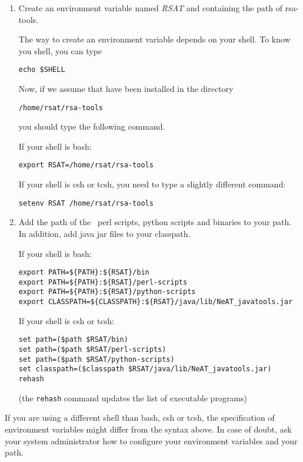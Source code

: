 \documentclass{book}
\begin{document}
\begin{enumerate}

\item Create an environment variable named \textit{RSAT} and
  containing the path of rsa-tools.

  The way to create an environment variable depends on your shell. To
  know you shell, you can type

\begin{verbatim}
echo $SHELL
\end{verbatim}

Now, if we assume that \RSAT have been installed in the directory

\begin{verbatim}
/home/rsat/rsa-tools
\end{verbatim}

you should type the following command.

If your shell is bash:
\begin{verbatim}
export RSAT=/home/rsat/rsa-tools
\end{verbatim}

If your shell is csh or tcsh, you need to type a slightly different
command:

\begin{verbatim}
setenv RSAT /home/rsat/rsa-tools
\end{verbatim}

\item Add the path of the \RSAT \ perl scripts, python scripts and binaries to your path. In addition, add java jar files
to your classpath.

If your shell is bash:
\begin{verbatim}
export PATH=${PATH}:${RSAT}/bin
export PATH=${PATH}:${RSAT}/perl-scripts
export PATH=${PATH}:${RSAT}/python-scripts
export CLASSPATH=${CLASSPATH}:${RSAT}/java/lib/NeAT_javatools.jar
\end{verbatim}

If your shell is csh or tcsh:
\begin{verbatim}
set path=($path $RSAT/bin)
set path=($path $RSAT/perl-scripts)
set path=($path $RSAT/python-scripts)
set classpath=($classpath $RSAT/java/lib/NeAT_javatools.jar)
rehash
\end{verbatim}

(the \texttt{rehash} command updates the list of executable programs)

\end{enumerate}

If you are using a different shell than bash, csh or tcsh, the
specification of environment variables might differ from the syntax
above.  In case of doubt, ask your system administrator how to
configure your environment variables and your path.
\end{document}
